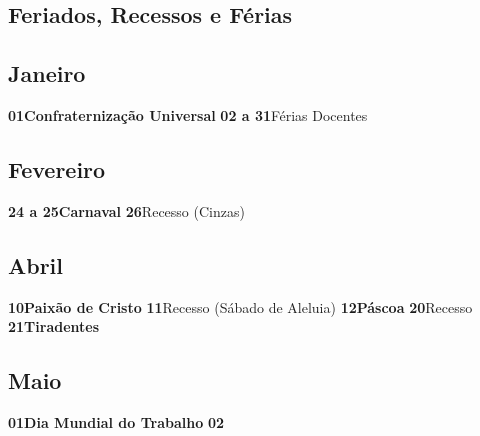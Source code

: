 \documentclass[thesis]{hmcposter}
\begin{document}
\begin{poster}
\newpage\onespacing \small \section{\color{hmcorange}Feriados, Recessos e Férias}\subsection{Janeiro}\textbf{01}\quad \quad \quad \quad \textbf{Confraternização Universal} \newline\textbf{02 a 31}\quad \quad Férias Docentes \newline\subsection{Fevereiro}\textbf{24 a 25}\quad \quad \textbf{Carnaval} \newline\textbf{26}\quad \quad \quad \quad Recesso (Cinzas) \newline\subsection{Abril}\textbf{10}\quad \quad \quad \quad \textbf{Paixão de Cristo} \newline\textbf{11}\quad \quad \quad \quad Recesso (Sábado de Aleluia) \newline\textbf{12}\quad \quad \quad \quad \textbf{Páscoa} \newline\textbf{20}\quad \quad \quad \quad Recesso \newline\textbf{21}\quad \quad \quad \quad \textbf{Tiradentes} \newline\subsection{Maio}\textbf{01}\quad \quad \quad \quad \textbf{Dia Mundial do Trabalho} \newline\textbf{02}\quad \quad \quad \q
\end{poster}
\end{document}
